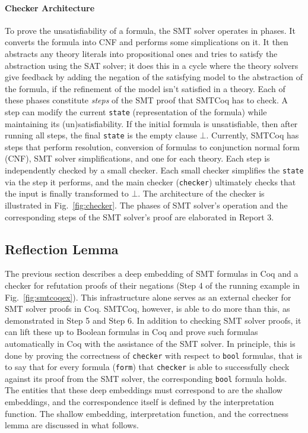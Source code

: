\documentclass{article}
\begin{document}
	\paragraph{Checker Architecture}
	To prove the unsatisfiability of a 
	formula, the SMT solver operates in 
	phases. It converts the formula into
	CNF and performs some simplications
	on it. It then abstracts any theory
	literals into propositional ones 
	and tries to satisfy the abstraction 
	using the SAT solver; it does this
	in a cycle where the theory
	solvers give feedback
	by adding the negation of the 
	satisfying model to the 
	abstraction of the formula, if the 
	refinement of the model isn't 
	satisfied in a theory. 
	Each of these phases constitute
	\textit{steps} of the SMT proof
	that SMTCoq has to check. A step
	can modify the current 
	\texttt{state} (representation of 
	the formula) while maintaining 
	its (un)satisfiability. If the 
	initial formula is unsatisfiable, 
	then after running all steps,
	the final \texttt{state} is the 
	empty clause $\bot$. Currently, 
	SMTCoq has steps that perform 
	resolution, conversion of formulas 
	to conjunction normal form (CNF), SMT 
	solver simplifications, and one for 
	each theory. Each step is 
	independently checked by a small 
	checker. Each small
	checker simplifies the  
	\texttt{state} via the step it 
	performs, and the main checker 
	(\texttt{checker}) ultimately checks 
	that the input is 
	finally transformed to $\bot$. The 
	architecture of the checker is 
	illustrated in
	Fig.~\ref{fig:checker}. The phases 
	of SMT solver's operation and the 
	corresponding steps of the
	SMT solver's proof are elaborated
	in Report 3.
	
	\subsection{Reflection Lemma}
	\label{sec:refl}
	The previous section describes a 
	deep embedding of SMT formulas 
	in Coq and a checker for 
	refutation proofs of their 
	negations (Step 4 of 
	the running example in 
	Fig.~\ref{fig:smtcoqex}). 
	This infrastructure alone serves 
	as an external checker for 
	SMT solver proofs in Coq.
	SMTCoq, however, is able to 
	do more than this, as demonstrated
	in Step 5 and Step 6. In addition 
	to checking SMT solver proofs, 
	it can lift these up to 
	Boolean formulas in Coq and
	prove such formulas automatically
	in Coq with the assistance of 
	the SMT solver. In principle,
	this is done by proving the
	correctness of \texttt{checker}
	with respect to \texttt{bool}
	formulas, that is to say that 
	for every formula (\texttt{form})
	that \texttt{checker} is able to 
	successfully check against its
	proof from the SMT solver, the 
	corresponding \texttt{bool}
	formula holds. The entities
	that these deep embeddings 
	must correspond to are the shallow
	embeddings, and the correspondence 
	itself is defined by the 
	interpretation function. The 
	shallow embedding, interpretation
	function, and the correctness 
	lemma are discussed in what
	follows.
	
\end{document}
